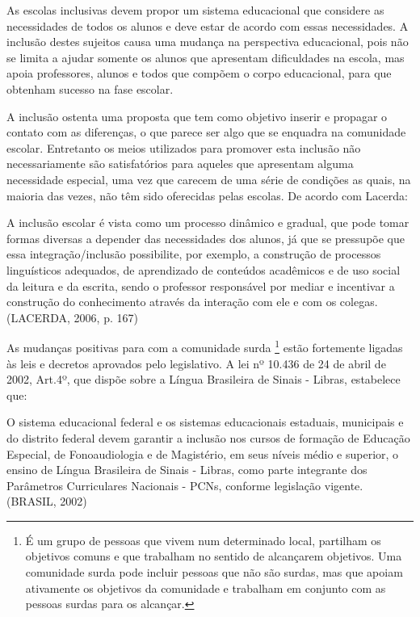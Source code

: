 \documentclass[brasil]{abnt}
\begin{document}
	As escolas inclusivas devem propor um sistema educacional que considere as necessidades de todos os alunos e 
	deve estar de acordo com essas necessidades. 
 	A inclusão destes sujeitos causa uma mudança na perspectiva educacional, pois não se limita a ajudar somente os alunos que apresentam dificuldades na escola, mas apoia professores,
 	alunos e todos que compõem o corpo educacional, para que obtenham sucesso na fase escolar. 
		
	A inclusão ostenta uma proposta que tem como objetivo inserir e propagar o contato com as diferenças, o que parece ser algo que se enquadra na comunidade escolar. Entretanto os meios utilizados
	para promover esta inclusão não necessariamente são satisfatórios para aqueles que apresentam alguma necessidade especial, uma vez que carecem de uma série de condições as quais, na maioria das vezes, 
	não têm sido oferecidas pelas escolas. De acordo com Lacerda:
		
			\begin{citacao}A inclusão escolar é vista como um processo dinâmico e gradual, que pode tomar formas diversas a depender das necessidades dos alunos, já que se pressupõe que essa integração/inclusão 
							possibilite, por exemplo, a construção de processos linguísticos adequados, de aprendizado de conteúdos acadêmicos e de uso social da leitura e da escrita, sendo o professor 
							responsável por mediar e incentivar a construção do conhecimento através da interação com ele e com os colegas. (LACERDA, 2006, p. 167)
			\end{citacao}
			
	As mudanças positivas para com a comunidade surda \footnote{É um grupo de pessoas que vivem num determinado local, partilham os objetivos comuns e que trabalham no sentido de alcançarem objetivos. 
	Uma comunidade surda pode incluir pessoas que não são surdas, mas que apoiam ativamente os objetivos da comunidade e trabalham em conjunto com as pessoas surdas para os alcançar.} estão fortemente ligadas 
	às leis e decretos aprovados pelo legislativo. A lei nº 10.436 de 24 de abril de 2002, Art.4º, que dispõe sobre a Língua Brasileira de Sinais - Libras, estabelece que:
		
			\begin{citacao} O sistema educacional federal e os sistemas educacionais estaduais, municipais e do distrito federal devem garantir a inclusão nos cursos de formação de Educação Especial, de 
							Fonoaudiologia e de Magistério, em seus níveis médio e superior, o ensino de Língua Brasileira de Sinais - Libras, como parte integrante dos Parâmetros Curriculares Nacionais - 
							PCNs, conforme legislação vigente. 
							(BRASIL, 2002)
			\end{citacao}
		
\end{document}
